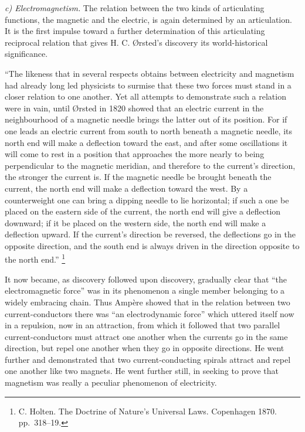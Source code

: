 \documentclass[12pt,a4paper]{book}
\newcommand{\runin}[1]{\emph{#1}\hspace{0.4em}}
\begin{document}
\runin{c) Electromagnetism.} The relation between the two kinds of articulating functions, the magnetic and the
electric, is again determined by an articulation. It is the first impulse toward a further determination of this
articulating reciprocal relation that gives H. C. Ørsted's discovery its world-historical significance.

``The likeness that in several respects obtains between electricity and magnetism had already long led physicists to
surmise that these two forces must stand in a closer relation to one another. Yet all attempts to demonstrate such a
relation were in vain, until Ørsted in 1820 showed that an electric current in the neighbourhood of a magnetic needle
brings the latter out of its position. For if one leads an electric current from south to north beneath a magnetic
needle, its north end will make a deflection toward the east, and after some oscillations it will come to rest in a
position that approaches the more nearly to being perpendicular to the magnetic meridian, and therefore to the current's
direction, the stronger the current is. If the magnetic needle be brought beneath the current, the north end will make a
deflection toward the west. By a counterweight one can bring a dipping needle to lie horizontal; if such a one be placed
on the eastern side of the current, the north end will give a deflection downward; if it be placed on the western side,
the north end will make a deflection upward. If the current's direction be reversed, the deflections go in the opposite
direction, and the south end is always driven in the direction opposite to the north end.''%
\footnote{%
C. Holten. The Doctrine of Nature's Universal Laws. Copenhagen 1870. pp.\ 318--19.}

It now became, as discovery followed upon discovery, gradually clear that ``the electromagnetic force'' was in its
phenomenon a single member belonging to a widely embracing chain. Thus Ampère showed that in the relation between two
current-conductors there was ``an electrodynamic force'' which uttered itself now in a repulsion, now in an attraction,
from which it followed that two parallel current-conductors must attract one another when the currents go in the same
direction, but repel
one another when they go in opposite directions. He went further and demonstrated that two current-conducting spirals
attract and repel one another like two magnets. He went further still, in seeking to prove that magnetism was really a
peculiar phenomenon of electricity.
\end{document}
